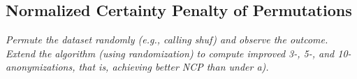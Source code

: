 \documentclass{report}
\begin{document}
		\subsection{Normalized Certainty Penalty of Permutations}
		\textit{Permute the dataset randomly (e.g., calling shuf) and observe the outcome. Extend the algorithm (using randomization) to compute improved 3-, 5-, and 10-anonymizations, that is, achieving better NCP than under a).}
		\startsubsection
		\closesection
	\closesection
\end{document}
